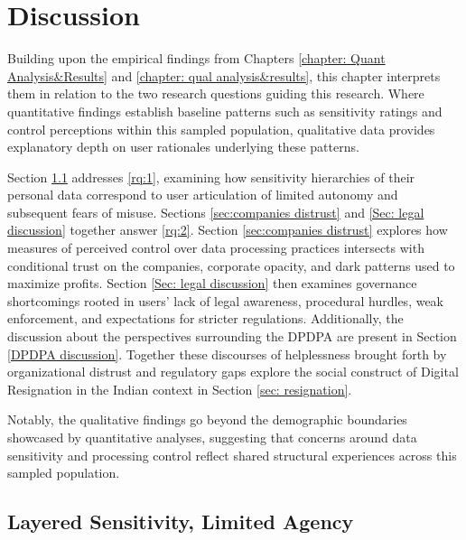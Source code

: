 \chapter{Discussion} \label{chapter:discussion}

Building upon the empirical findings from Chapters \ref{chapter: Quant Analysis&Results} and \ref{chapter: qual analysis&results}, this chapter interprets them in relation to the two research questions guiding this research. Where quantitative findings establish baseline patterns such as sensitivity ratings and control perceptions within this sampled population, qualitative data provides explanatory depth on user rationales underlying these patterns. 

Section \ref{sec:sensitivities of PD} addresses \ref{rq:1}, examining how sensitivity hierarchies of their personal data correspond to user articulation of limited autonomy and subsequent fears of misuse. Sections \ref{sec:companies distrust} and \ref{Sec: legal discussion} together answer \ref{rq:2}. Section \ref{sec:companies distrust} explores how measures of perceived control over data processing practices intersects with conditional trust on the companies, corporate opacity, and dark patterns used to maximize profits. Section \ref{Sec: legal discussion} then examines governance shortcomings rooted in users' lack of legal awareness, procedural hurdles, weak enforcement, and expectations for stricter regulations. Additionally, the discussion about the perspectives surrounding the DPDPA are present in Section \ref{DPDPA discussion}. Together these discourses of helplessness brought forth by organizational distrust and regulatory gaps explore the social construct of Digital Resignation \cite{draper_corporate_2019} in the Indian context in Section \ref{sec: resignation}.

Notably, the qualitative findings go beyond the demographic boundaries showcased by quantitative analyses, suggesting that concerns around data sensitivity and processing control reflect shared structural experiences across this sampled population. 

\section{Layered Sensitivity, Limited Agency} \label{sec:sensitivities of PD}

